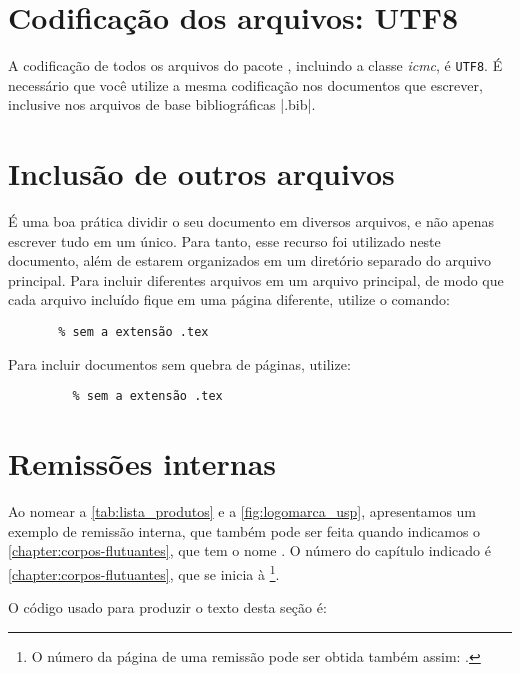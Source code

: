 
\section{Codificação dos arquivos: UTF8}

A codificação de todos os arquivos do pacote \abnTeX, incluindo a classe \textit{icmc}, é \texttt{UTF8}. É necessário que
você utilize a mesma codificação nos documentos que escrever, inclusive nos
arquivos de base bibliográficas |.bib|.



\section{Inclusão de outros arquivos}\label{sec-include}

É uma boa prática dividir o seu documento em diversos arquivos, e não
apenas escrever tudo em um único. Para tanto, esse recurso foi utilizado neste
documento, além de estarem organizados em um diretório separado do arquivo principal. Para incluir diferentes arquivos em um arquivo principal,
de modo que cada arquivo incluído fique em uma página diferente, utilize o
comando:

\begin{verbatim}
       % sem a extensão .tex
\end{verbatim}

Para incluir documentos sem quebra de páginas, utilize:

\begin{verbatim}
         % sem a extensão .tex
\end{verbatim}



\section{Remissões internas}

Ao nomear a \autoref{tab:lista_produtos} e a \autoref{fig:logomarca_usp}, apresentamos um exemplo de remissão interna, que também pode ser feita quando indicamos o \autoref{chapter:corpos-flutuantes}, que tem o nome \emph{}. O número do capítulo indicado é \ref{chapter:corpos-flutuantes}, que se inicia à \footnote{O número da página de uma remissão pode ser obtida também assim:
\pageref{chapter:corpos-flutuantes}.}.

O código usado para produzir o texto desta seção é:

